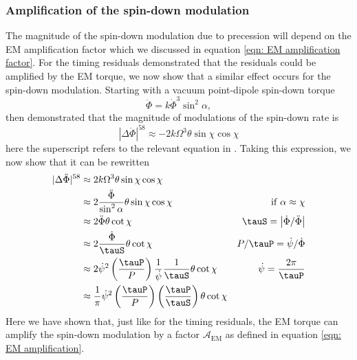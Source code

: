 \documentclass[/home/greg/Thesis/main/main.tex]{subfiles}
\begin{document}
\subsubsection{Amplification of the spin-down modulation}
The magnitude of the spin-down modulation due to precession will 
depend on the EM amplification factor which we discussed in equation 
\eqref{eqn: EM amplification factor}. For the timing residuals \citet{Jones2001}
demonstrated that the residuals could be amplified by the EM torque, we now
show that a similar effect occurs for the 
spin-down modulation. Starting with a vacuum point-dipole spin-down torque
\begin{equation}
    \ddot{\Phi} = k\dot{\Phi}^{3}\sin^{2}\alpha,
\end{equation}
then \citet{Jones2001} demonstrated that the magnitude of modulations of the 
spin-down rate is
\begin{equation}
    |\Delta\ddot{\Phi}|^{58} \approx -2k\Omega^{3} \theta \sin\chi \cos\chi 
\end{equation}
here the superscript refers to the relevant equation in \citet{Jones2001}. Taking
this expression, we now show that it can be rewritten
\begin{align}
    |\Delta\ddot{\Phi}|^{58} 
    & \approx 2k\Omega^{3} \theta \sin\chi \cos\chi & \\
    & \approx 2 \frac{\ddot{\Phi}}{\sin^{2}\alpha} \theta \sin\chi\cos\chi &
    \mathrm{if }\; \alpha \approx \chi \\
    & \approx 2 \ddot{\Phi}\theta \cot\chi & 
    \tauS = \left| \dot{\Phi} / \ddot{\Phi}\right| \\
    & \approx 2 \frac{\dot{\Phi}}{\tauS} \theta \cot\chi &
    P/\tauP = \dot{\psi}/\dot{\Phi} \\
    & \approx 2 \dot{\psi}^{2}\left(\frac{\tauP}{P}\right) \frac{1}{\dot{\psi}} \frac{1}{\tauS} \theta \cot \chi & \dot{\psi} = \frac{2\pi}{\tauP} \\
    & \approx \frac{1}{\pi}\dot{\psi}^{2}\left(\frac{\tauP}{P}\right)\left(\frac{\tauP}{\tauS}\right) \theta \cot\chi
    \label{eqn: spin-down variations FP EM}
\end{align}
Here we have shown that, just like for the timing residuals, the EM torque can
amplify the spin-down modulation by a factor $\mathcal{A}_{\mathrm{EM}}$ as defined in equation \eqref{eqn: EM amplification}.
\end{document}
